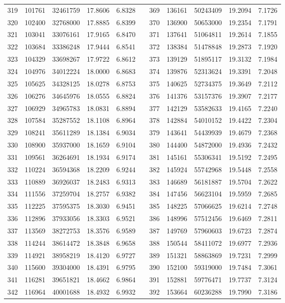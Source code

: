 \begin{longtable}{rrrrrrrrrrr}
319&101761&32461759&17.8606&6.8328&&369&136161&50243409&19.2094&7.1726\\
320&102400&32768000&17.8885&6.8399&&370&136900&50653000&19.2354&7.1791\\
321&103041&33076161&17.9165&6.8470&&371&137641&51064811&19.2614&7.1855\\
322&103684&33386248&17.9444&6.8541&&372&138384&51478848&19.2873&7.1920\\
323&104329&33698267&17.9722&6.8612&&373&139129&51895117&19.3132&7.1984\\
324&104976&34012224&18.0000&6.8683&&374&139876&52313624&19.3391&7.2048\\
325&105625&34328125&18.0278&6.8753&&375&140625&52734375&19.3649&7.2112\\
326&106276&34645976&18.0555&6.8824&&376&141376&53157376&19.3907&7.2177\\
327&106929&34965783&18.0831&6.8894&&377&142129&53582633&19.4165&7.2240\\
328&107584&35287552&18.1108&6.8964&&378&142884&54010152&19.4422&7.2304\\
329&108241&35611289&18.1384&6.9034&&379&143641&54439939&19.4679&7.2368\\
330&108900&35937000&18.1659&6.9104&&380&144400&54872000&19.4936&7.2432\\
331&109561&36264691&18.1934&6.9174&&381&145161&55306341&19.5192&7.2495\\
332&110224&36594368&18.2209&6.9244&&382&145924&55742968&19.5448&7.2558\\
333&110889&36926037&18.2483&6.9313&&383&146689&56181887&19.5704&7.2622\\
334&111556&37259704&18.2757&6.9382&&384&147456&56623104&19.5959&7.2685\\
335&112225&37595375&18.3030&6.9451&&385&148225&57066625&19.6214&7.2748\\
336&112896&37933056&18.3303&6.9521&&386&148996&57512456&19.6469&7.2811\\
337&113569&38272753&18.3576&6.9589&&387&149769&57960603&19.6723&7.2874\\
338&114244&38614472&18.3848&6.9658&&388&150544&58411072&19.6977&7.2936\\
339&114921&38958219&18.4120&6.9727&&389&151321&58863869&19.7231&7.2999\\
340&115600&39304000&18.4391&6.9795&&390&152100&59319000&19.7484&7.3061\\
341&116281&39651821&18.4662&6.9864&&391&152881&59776471&19.7737&7.3124\\
342&116964&40001688&18.4932&6.9932&&392&153664&60236288&19.7990&7.3186\\

\end{longtable}
